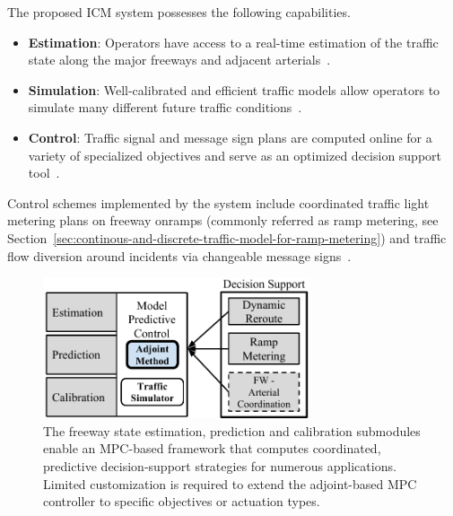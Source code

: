 The proposed ICM system possesses the following capabilities.

\begin{itemize}
	\item \textbf{Estimation}: Operators have access to a real-time estimation of the traffic state along the major freeways and adjacent arterials~\cite{work2010traffic,Jacqueta,eisenman2006number}.
	\item \textbf{Simulation}: Well-calibrated and efficient traffic models allow operators to simulate many different future traffic conditions~\cite{Muralidharan2009b,dervisoglu2014macroscopic,Hunter}.
	\item \textbf{Control}: Traffic signal and message sign plans are computed online for a variety of specialized objectives and serve as an optimized decision support tool~\cite{Reilly2013b,Reilly2014b}.
\end{itemize}

Control schemes implemented by the system include coordinated traffic light metering plans on freeway onramps (commonly referred as ramp metering, see Section~\ref{sec:continous-and-discrete-traffic-model-for-ramp-metering}) and traffic flow diversion around incidents via changeable message signs~\cite{Samaranayake2014}. 

\begin{figure}[htbp]
	\centering
	\includegraphics[width=0.7\textwidth]{diagrams/f2}
	\caption[\emph{Connected Corridors} control system architecture.]{The freeway state estimation, prediction and calibration submodules enable an MPC-based framework that computes coordinated, predictive decision-support strategies for numerous applications. Limited customization is required to extend the adjoint-based MPC controller to specific objectives or actuation types.}
	\label{fig:decision-support}
\end{figure}

